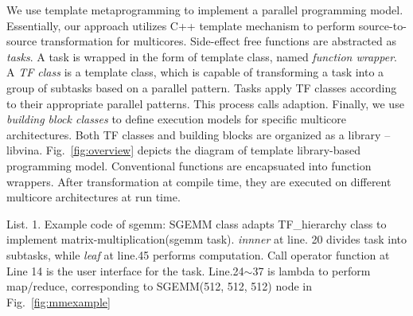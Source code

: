 We use template metaprogramming to implement a parallel programming model.
Essentially, our approach utilizes C++ template mechanism to
perform source-to-source transformation for multicores. Side-effect
free functions are abstracted as \textit{tasks}. A task is
wrapped in the form of template class, named \emph{function
  wrapper}.  A \textit{TF class} is a template class, which
is capable of transforming a task into a group of subtasks based on
a parallel pattern. Tasks
apply TF classes according to their appropriate
parallel patterns. This process calls adaption. 
Finally, we use \textit{building block classes} to define execution models
for specific multicore architectures. Both TF classes and building
blocks are organized as a library --
libvina. Fig.~\ref{fig:overview} depicts the diagram of template
library-based programming model. Conventional functions are
encapsuated into function wrappers. After transformation at compile time, they are
executed on different multicore architectures at run time.

\renewcommand\linenumberfont{\normalfont\small}
\setlength\linenumbersep{-0.06in}





\makebox[3.4in]{\hrulefill}

List. 1. Example code of sgemm: SGEMM class adapts TF\_hierarchy
class to implement matrix-multiplication(sgemm task). \textit{innner} at
line. 20 divides task into subtasks, while \textit{leaf} at line.45 performs
computation. Call operator function at Line 14 is the user interface for the task.
Line.24$\sim$37 is lambda to perform map/reduce, corresponding to
SGEMM(512, 512, 512) node in Fig.~\ref{fig:mmexample}\\


\makebox[3.4in]{\hrulefill}

